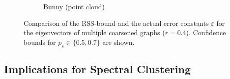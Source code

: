 \begin{figure}[ht]
\begin{subfigure}{0.33\textwidth}
		\caption{Bunny (point cloud)}\label{fig:cons:example:bunny}
	\end{subfigure}
	\caption{%
		Comparison of the RSS-bound and the actual error constants $\varepsilon$ for the eigenvectors of multiple coarsened graphs ($r = 0.4$).
		Confidence bounds for $p_s \in \{0.5, 0.7\}$ are shown.
	}\label{fig:cons:example}
\end{figure}

\subsection{Implications for Spectral Clustering}%
\label{sec:cons:sc}
